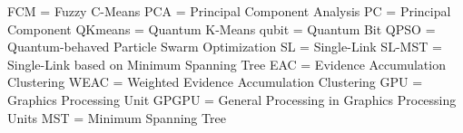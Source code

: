 FCM = Fuzzy C-Means
PCA = Principal Component Analysis
PC = Principal Component
QKmeans = Quantum K-Means
qubit = Quantum Bit
QPSO = Quantum-behaved Particle Swarm Optimization
SL = Single-Link
SL-MST = Single-Link based on Minimum Spanning Tree
EAC = Evidence Accumulation Clustering
WEAC = Weighted Evidence Accumulation Clustering
GPU = Graphics Processing Unit
GPGPU = General Processing in Graphics Processing Units
MST = Minimum Spanning Tree
